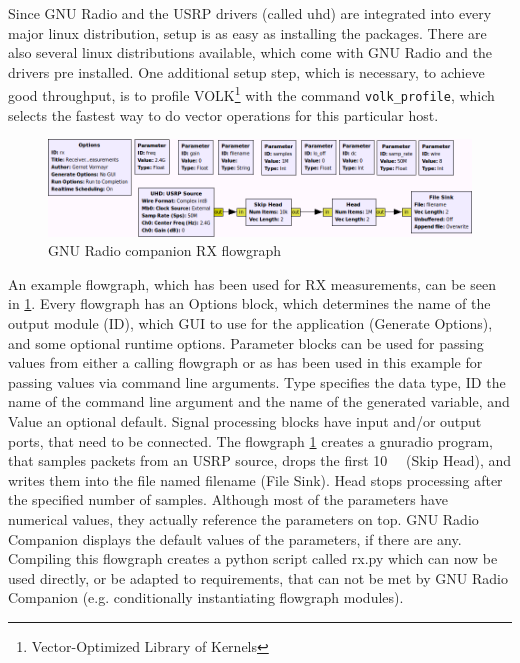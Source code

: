 \documentclass[12pt,a4paper,parskip=full,abstracton]{scrartcl}
\begin{document}
Since GNU Radio and the USRP drivers (called uhd) are integrated into every
major linux distribution, setup is as easy as installing the packages. There are
also several linux distributions available, which come with GNU Radio and the drivers
pre installed. One additional setup step, which is necessary, to achieve good throughput,
is to profile VOLK\footnote{Vector-Optimized Library of Kernels} with the command
\verb+volk_profile+, which selects the fastest way to do vector operations for this
particular host\cite{gnuradio_volk}.

\begin{figure}[htb]
    \centering
    \includegraphics[width=\linewidth]{grc}
    \caption{GNU Radio companion RX flowgraph}
    \label{fig:grc_rx}
\end{figure}
An example flowgraph, which has been used for RX measurements, can be seen in \cref{fig:grc_rx}.
Every flowgraph has an {\ttfamily Options} block, which determines the name of the output module ({\ttfamily ID}),
which GUI to use for the application ({\ttfamily Generate Options}), and some optional runtime options.
{\ttfamily Parameter} blocks can be used for passing values from either a calling flowgraph or as has
been used in this example for passing values via command line arguments. {\ttfamily Type} specifies the
data type, {\ttfamily ID} the name of the command line argument and the name of the generated variable,
and {\ttfamily Value} an optional default. Signal processing blocks have input and/or output ports, that
need to be connected. The flowgraph \cref{fig:grc_rx} creates a gnuradio program, that samples
packets from an USRP source, drops the first \SI{10}{\kilo\samples} ({\ttfamily Skip Head}), and writes
them into the file named {\ttfamily filename} ({\ttfamily File Sink}). {\ttfamily Head} stops processing after the
specified number of samples. Although most of the parameters have numerical values, they actually
reference the parameters on top. GNU Radio Companion displays the default values of the parameters,
if there are any. Compiling this flowgraph creates a python script called {\ttfamily rx.py} which
can now be used directly, or be adapted to requirements, that can not be met by GNU Radio Companion (e.g.
conditionally instantiating flowgraph modules).
\end{document}
